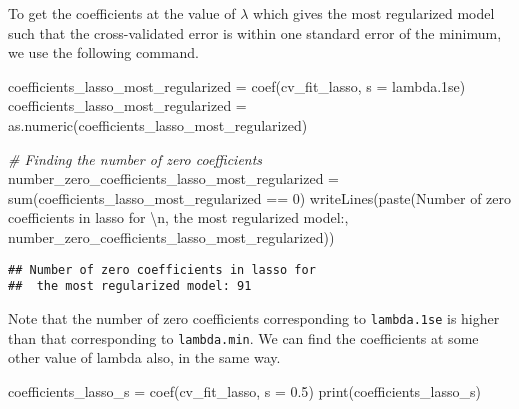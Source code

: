\documentclass[
]{book}
\newenvironment{Shaded}{\begin{snugshade}}{\end{snugshade}}
\newcommand{\AttributeTok}[1]{\textcolor[rgb]{0.77,0.63,0.00}{#1}}
\newcommand{\CommentTok}[1]{\textcolor[rgb]{0.56,0.35,0.01}{\textit{#1}}}
\newcommand{\DecValTok}[1]{\textcolor[rgb]{0.00,0.00,0.81}{#1}}
\newcommand{\FloatTok}[1]{\textcolor[rgb]{0.00,0.00,0.81}{#1}}
\newcommand{\FunctionTok}[1]{\textcolor[rgb]{0.00,0.00,0.00}{#1}}
\newcommand{\NormalTok}[1]{#1}
\newcommand{\OtherTok}[1]{\textcolor[rgb]{0.56,0.35,0.01}{#1}}
\newcommand{\SpecialCharTok}[1]{\textcolor[rgb]{0.00,0.00,0.00}{#1}}
\newcommand{\StringTok}[1]{\textcolor[rgb]{0.31,0.60,0.02}{#1}}
\begin{document}
To get the coefficients at the value of \(\lambda\) which gives the most regularized model such that the cross-validated error is within one standard error of the minimum, we use the following command.

\begin{Shaded}
\begin{Highlighting}[]
\NormalTok{coefficients\_lasso\_most\_regularized }\OtherTok{=}
  \FunctionTok{coef}\NormalTok{(cv\_fit\_lasso, }\AttributeTok{s =} \StringTok{\textquotesingle{}lambda.1se\textquotesingle{}}\NormalTok{)}
\NormalTok{coefficients\_lasso\_most\_regularized }\OtherTok{=}
  \FunctionTok{as.numeric}\NormalTok{(coefficients\_lasso\_most\_regularized)}

\CommentTok{\# Finding the number of zero coefficients}
\NormalTok{number\_zero\_coefficients\_lasso\_most\_regularized }\OtherTok{=}
  \FunctionTok{sum}\NormalTok{(coefficients\_lasso\_most\_regularized }\SpecialCharTok{==} \DecValTok{0}\NormalTok{)}
\FunctionTok{writeLines}\NormalTok{(}\FunctionTok{paste}\NormalTok{(}\StringTok{\textquotesingle{}Number of zero coefficients in lasso for }\SpecialCharTok{\textbackslash{}n}\StringTok{\textquotesingle{}}\NormalTok{,}
                 \StringTok{\textquotesingle{}the most regularized model:\textquotesingle{}}\NormalTok{,}
\NormalTok{                 number\_zero\_coefficients\_lasso\_most\_regularized))}
\end{Highlighting}
\end{Shaded}

\begin{verbatim}
## Number of zero coefficients in lasso for 
##  the most regularized model: 91
\end{verbatim}

Note that the number of zero coefficients corresponding to \texttt{lambda.1se} is higher than that corresponding to \texttt{lambda.min}. We can find the coefficients at some other value of lambda also, in the same way.

\begin{Shaded}
\begin{Highlighting}[]
\NormalTok{coefficients\_lasso\_s }\OtherTok{=} \FunctionTok{coef}\NormalTok{(cv\_fit\_lasso, }\AttributeTok{s =} \FloatTok{0.5}\NormalTok{)}
\FunctionTok{print}\NormalTok{(coefficients\_lasso\_s)}
\end{Highlighting}
\end{Shaded}
\end{document}
